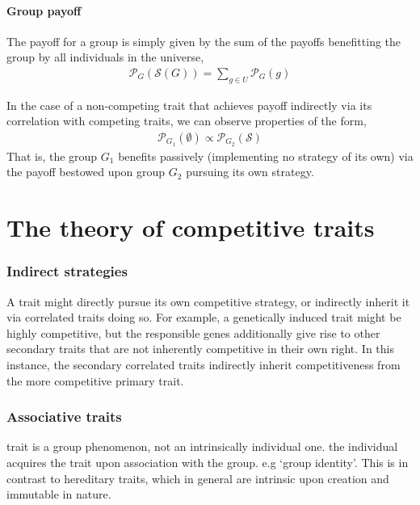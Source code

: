 \documentclass[twocolumn, aps, rmp, amsmath, amssymb, nofootinbib, superscriptaddress, longbibliography, floatfix, table-of-contents, eqsecnum]{revtex4-1}
\begin{document}
\subsection{Group payoff}

The payoff for a group is simply given by the sum of the payoffs benefitting the group by all individuals in the universe,
\begin{align}
	\mathcal{P}_{G}(\mathcal{S}(G)) = \sum_{g\in U} \mathcal{P}_G(g)
\end{align}

In the case of a non-competing trait that achieves payoff indirectly via its correlation with competing traits, we can observe properties of the form,
\begin{align}
	\mathcal{P}_{G_1}(\emptyset) \propto \mathcal{P}_{G_2}(\mathcal{S})
\end{align}
That is, the group $G_1$ benefits passively (implementing no strategy of its own) via the payoff bestowed upon group $G_2$ pursuing its own strategy.

%
%

\part{The theory of competitive traits}

\section{Indirect strategies}

A trait might directly pursue its own competitive strategy, or indirectly inherit it via correlated traits doing so. For example, a genetically induced trait might be highly competitive, but the responsible genes additionally give rise to other secondary traits that are not inherently competitive in their own right. In this instance, the secondary correlated traits indirectly inherit competitiveness from the more competitive primary trait.

\section{Associative traits}

trait is a group phenomenon, not an intrinsically individual one. the individual acquires the trait upon association with the group. e.g `group identity'. This is in contrast to hereditary traits, which in general are intrinsic upon creation and immutable in nature.
\end{document}
